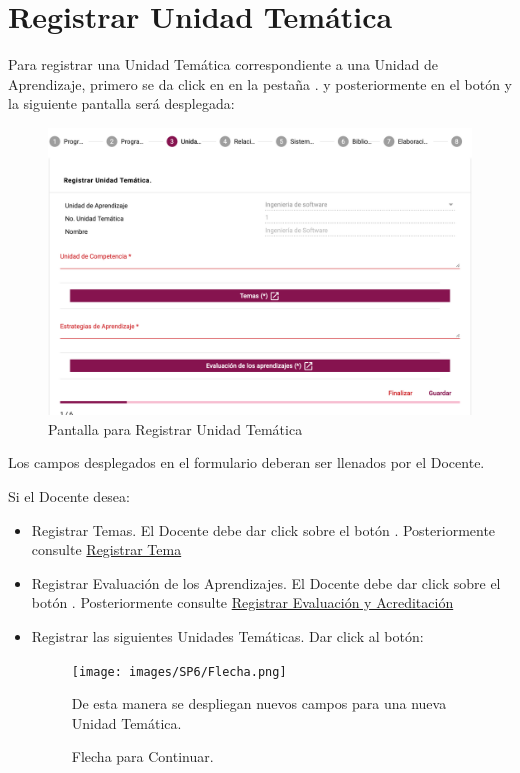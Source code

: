 \section{Registrar Unidad Temática}

Para registrar una Unidad Temática  correspondiente a una Unidad de Aprendizaje, primero se da click en en la pestaña . y posteriormente en el botón  y la siguiente pantalla será desplegada:

\hypertarget{RUT}{\begin{figure}[!h]
    \centering
    \hypertarget{9}{\includegraphics[width=0.5\linewidth]{images/SP6/RegistrarUT.png}}
    \caption{Pantalla para Registrar Unidad Temática}
\end{figure}
}


Los campos desplegados en el formulario deberan ser llenados por el Docente.

Si el Docente desea:

\begin{itemize}
    \item Registrar Temas. El Docente debe dar click sobre el botón . Posteriormente consulte \hyperlink{RegistrarTema}{Registrar Tema}
    \item Registrar Evaluación de los Aprendizajes. El Docente debe dar click sobre el botón . Posteriormente consulte \hyperlink{RegistrarEvalAprend}{Registrar Evaluación y Acreditación}
    \item Registrar las siguientes Unidades Temáticas. Dar click al botón:
    \begin{figure}[!hbtp]
    \centering
    \texttt{[image: images/SP6/Flecha.png]}
    \caption{Flecha para Continuar.} 
    
    De esta manera se despliegan nuevos campos para una nueva Unidad Temática. 
\end{figure}
    
\end{itemize}

